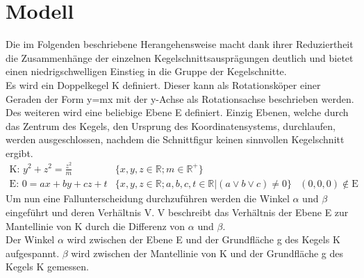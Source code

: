 \setcounter{section}{0}
\section{Modell}
Die im Folgenden beschriebene Herangehensweise macht dank ihrer Reduziertheit die Zusammenhänge der einzelnen Kegelschnittsausprägungen deutlich und bietet einen niedrigschwelligen Einstieg in die Gruppe der Kegelschnitte.\\
Es wird ein Doppelkegel K definiert. Dieser kann als Rotationsköper einer Geraden der Form y=mx mit der y-Achse als Rotationsachse beschrieben werden. Des weiteren wird eine beliebige Ebene E definiert. Einzig Ebenen, welche durch das Zentrum des Kegels, den Ursprung des Koordinatensystems, durchlaufen, werden ausgeschlossen, nachdem die Schnittfigur keinen sinnvollen Kegelschnitt ergibt.
\begin{displaymath}
	\begin{array}{lrl}
		\text{K: }y^2+z^2=\frac{z^2}{m} & \{x,y,z\in \mathbb{R};m\in \mathbb{R}^{\!+\!}\}\\
		\text{E: }0=ax+by+cz+t & \{x,y,z\in \mathbb{R}; a,b,c,t\in \mathbb{R}|(a \lor b \lor c) \neq 0\} & (0,0,0) \notin \text{E}
	\end{array}
\end{displaymath}
Um nun eine Fallunterscheidung durchzuführen werden die Winkel \(\alpha\) und \(\beta\) eingeführt und deren Verhältnis V. V beschreibt das Verhältnis der Ebene E zur Mantellinie von K durch die Differenz von \(\alpha\) und \(\beta\).\\
Der Winkel \(\alpha\) wird zwischen der Ebene E und der Grundfläche g des Kegels K aufgespannt. \(\beta\) wird zwischen der Mantellinie von K und der Grundfläche g des Kegels K gemessen.\\

